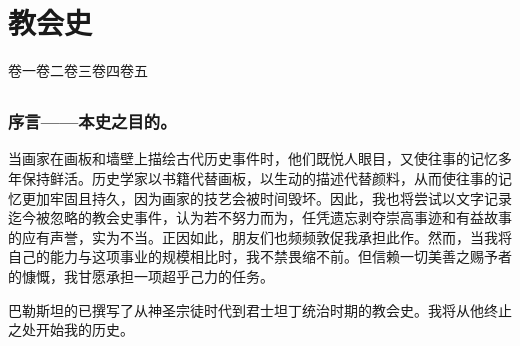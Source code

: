 
\chapter{教会史}


卷一\newline{}卷二\newline{}卷三\newline{}卷四\newline{}卷五\par



\section{}


\subsection{序言——本史之目的。}

当画家在画板和墙壁上描绘古代历史事件时，他们既悦人眼目，又使往事的记忆多年保持鲜活。历史学家以书籍代替画板，以生动的描述代替颜料，从而使往事的记忆更加牢固且持久，因为画家的技艺会被时间毁坏。因此，我也将尝试以文字记录迄今被忽略的教会史事件，认为若不努力而为，任凭遗忘剥夺崇高事迹和有益故事的应有声誉，实为不当。正因如此，朋友们也频频敦促我承担此作。然而，当我将自己的能力与这项事业的规模相比时，我不禁畏缩不前。但信赖一切美善之赐予者的慷慨，我甘愿承担一项超乎己力的任务。\par

巴勒斯坦的已撰写了从神圣宗徒时代到君士坦丁统治时期的教会史。我将从他终止之处开始我的历史。\par

